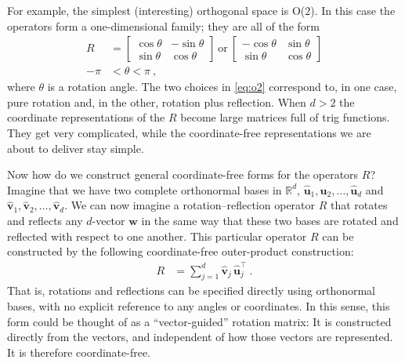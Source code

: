 \documentclass{article}
\newcommand{\Evec}[1]{{\mathbf{#1}}} %
\newcommand{\Ehat}[1]{{\mathbf{\hat{#1}}}} %
\begin{document}
For example, the simplest (interesting) orthogonal space is O($2$). In this case the operators form a one-dimensional family; they are all of the form
\begin{align}
    R &= \begin{bmatrix}\cos{\theta} & -\sin{\theta} \\ \sin{\theta} & \cos{\theta}\end{bmatrix} ~\mbox{or}~
    \begin{bmatrix}-\cos{\theta} & \sin{\theta} \\ \sin{\theta} & \cos{\theta}\end{bmatrix} \label{eq:o2}
    \\
    -\pi &< \theta < \pi ~, \nonumber
\end{align}
where $\theta$ is a rotation angle.
The two choices in \eqref{eq:o2} correspond to, in one case, pure rotation and, in the other, rotation plus reflection.
When $d>2$ the coordinate representations of the $R$ become large matrices full of trig functions.
They get very complicated, while the coordinate-free representations we are about to deliver stay simple.

Now how do we construct general coordinate-free forms for the operators $R$?
Imagine that we have two complete orthonormal bases in $\mathbb{R}^d$, $\Ehat{u}_1,\Ehat{u}_2,\ldots,\Ehat{u}_d$ and $\Ehat{v}_1,\Ehat{v}_2,\ldots,\Ehat{v}_d$.
We can now imagine a rotation--reflection operator $R$ that rotates and reflects any $d$-vector $\Evec{w}$ in the same way that these two bases are rotated and reflected with respect to one another.
This particular operator $R$ can be constructed by the following coordinate-free outer-product construction:
\begin{align}
    R &= \sum_{j=1}^d \Ehat{v}_j\,\Ehat{u}_j^\top ~.\label{eq:rotationoperator}
\end{align}
That is, rotations and reflections can be specified directly using orthonormal bases, with no explicit reference to any angles or coordinates.
In this sense, this form could be thought of as a ``vector-guided'' rotation matrix:
It is constructed directly from the vectors, and independent of how those vectors are represented.
It is therefore coordinate-free.
\end{document}

